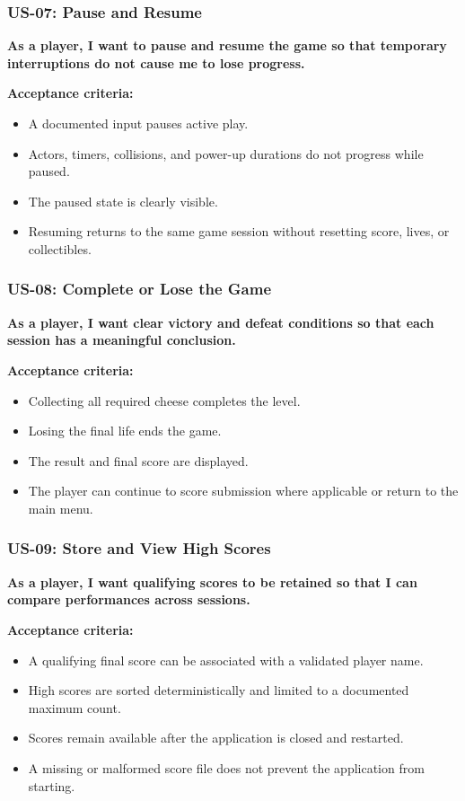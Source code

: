 \subsubsection{US-07: Pause and Resume}

\textbf{As a player, I want to pause and resume the game so that temporary interruptions do not cause me to lose progress.}

\textbf{Acceptance criteria:}
\begin{itemize}
	\item A documented input pauses active play.
	\item Actors, timers, collisions, and power-up durations do not progress while paused.
	\item The paused state is clearly visible.
	\item Resuming returns to the same game session without resetting score, lives, or collectibles.
\end{itemize}

\subsubsection{US-08: Complete or Lose the Game}

\textbf{As a player, I want clear victory and defeat conditions so that each session has a meaningful conclusion.}

\textbf{Acceptance criteria:}
\begin{itemize}
	\item Collecting all required cheese completes the level.
	\item Losing the final life ends the game.
	\item The result and final score are displayed.
	\item The player can continue to score submission where applicable or return to the main menu.
\end{itemize}

\subsubsection{US-09: Store and View High Scores}

\textbf{As a player, I want qualifying scores to be retained so that I can compare performances across sessions.}

\textbf{Acceptance criteria:}
\begin{itemize}
	\item A qualifying final score can be associated with a validated player name.
	\item High scores are sorted deterministically and limited to a documented maximum count.
	\item Scores remain available after the application is closed and restarted.
	\item A missing or malformed score file does not prevent the application from starting.
\end{itemize}

